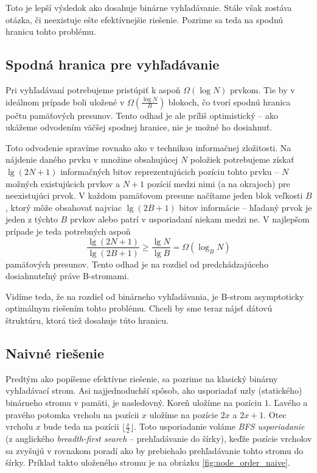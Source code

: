 Toto je lepší výsledok ako dosahuje binárne vyhľadávanie. Stále však zostáva otázka, či neexistuje  ešte efektívnejšie riešenie. Pozrime sa teda na spodnú hranicu tohto problému.

\subsection{Spodná hranica pre vyhľadávanie} \label{sec:tree-lowerbound}
Pri vyhľadávaní potrebujeme pristúpiť k aspoň $\Omega(\log{N})$ prvkom. Tie by v ideálnom prípade boli uložené v $\Omega(\frac{\log{N}}{B})$ blokoch, čo tvorí spodnú hranica počtu pamäťových presunov. Tento odhad je ale príliš optimistický -- ako ukážeme odvodením väčšej spodnej hranice, nie je možné ho dosiahnuť.

Toto odvodenie spravíme rovnako ako v \citep{demaineoverview} technikou informačnej zložitosti. Na nájdenie daného prvku v množine obsahujúcej $N$ položiek potrebujeme získať $\lg(2N+1)$ informačných bitov reprezentujúcich pozíciu tohto prvku -- $N$ možných existujúcich prvkov a $N+1$ pozícií medzi nimi (a na okrajoch) pre neexistujúci prvok. V každom pamäťovom presune načítame jeden blok veľkosti $B$, ktorý môže obsahovať najviac $\lg(2B+1)$ bitov informácie -- hľadaný prvok je jeden z týchto $B$ prvkov alebo patrí v usporiadaní niekam medzi ne. V najlepšom prípade je teda potrebných aspoň
\[
\frac{\lg(2N+1)}{\lg(2B+1)} \ge \frac{\lg N}{\lg B} = \Omega(\log_B{N})
\]
pamäťových presunov. Tento odhad je na rozdiel od predchádzajúceho dosiahnuteľný práve \aware B-stromami.

Vidíme teda, že na rozdiel od \obliv binárneho vyhľadávania, je \aware B-strom asymptoticky optimálnym riešením tohto problému. Chceli by sme teraz nájsť \obliv dátovú štruktúru, ktorá tiež dosahuje túto hranicu.

\subsection{Naivné \obliv riešenie} \label{sec:static-naive}
Predtým ako popíšeme efektívne \obliv riešenie, sa pozrime na klasický binárny vyhľadávací strom. Asi najjednoduchší spôsob, ako usporiadať uzly (statického) binárneho stromu v pamäti, je nasledovný. Koreň uložíme na pozíciu $1$. Ľavého a pravého potomka vrcholu na pozícii $x$ uložíme na pozície $2x$ a $2x+1$. Otec vrcholu $x$ bude teda na pozícii $\lfloor\frac{x}{2}\rfloor$. Toto usporiadanie voláme \emph{BFS usporiadanie} (z anglického \emph{breadth-first search} -- prehľadávanie do šírky), keďže pozície vrcholov sa zvyšujú v rovnakom poradí ako by prebiehalo prehľadávanie tohto stromu do šírky. Príklad takto uloženého stromu je na obrázku \ref{fig:node_order_naive}.

